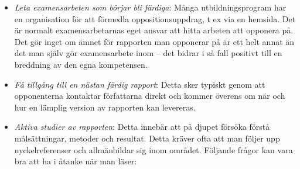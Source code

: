 \begin{itemize}
\item
  \emph{Leta examensarbeten som börjar bli färdiga}: Många
  utbildningsprogram har en organisation för att förmedla
  oppositionsuppdrag, t ex via en hemsida. Det är normalt
  examensarbetarnas eget ansvar att hitta arbeten att opponera på. Det
  gör inget om ämnet för rapporten man opponerar på är ett helt annat än
  det man själv gör examensarbete inom -- det bidrar i så fall positivt
  till en breddning av den egna kompetensen.
\item
  \emph{Få tillgång till en nästan färdig rapport}: Detta sker typiskt
  genom att opponenterna kontaktar författarna direkt och kommer överens
  om när och hur en lämplig version av rapporten kan levereras.
\item
  \emph{Aktiva studier av rapporten}: Detta innebär att på djupet
  försöka förstå målsättningar, metoder och resultat. Detta kräver ofta
  att man följer upp nyckelreferenser och allmänbildar sig inom området.
  Följande frågor kan vara bra att ha i åtanke när man läser:


\end{itemize}
